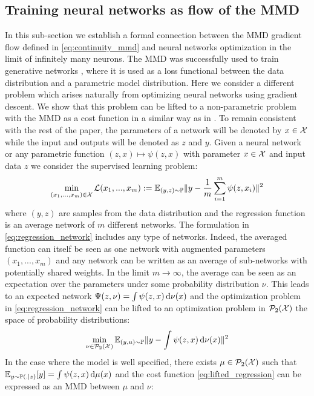 \subsection{Training neural networks as flow of the MMD}\label{subsec:training_neural_networks}
In this sub-section we establish a formal connection between the MMD gradient flow defined in \cref{eq:continuity_mmd} and neural networks optimization in the limit of infinitely many neurons.
The MMD was successfully used to train generative networks \cite{Arbel:2018,Binkowski:2018}, where it is used as a loss functional between the data distribution and a parametric model distribution.
Here we consider a different problem which arises naturally from optimizing neural networks using gradient descent. We show that this problem can be lifted to a non-parametric problem with the MMD as a cost function in a similar way as in \cite{Rotskoff:2019}. To remain consistent with the rest of the paper, the parameters of a network will be denoted by $x\in {{\mathcal X}}$ while the input and outputs will be denoted as $z$ and $y$.
 Given a neural network or any parametric function $(z,x)\mapsto \psi(z,x)$ with parameter $x \in {{\mathcal X}} $ and input data $z$ we consider the supervised learning problem:
\begin{align}\label{eq:regression_network}
	\min_{(x_1,...,x_m )\in {{\mathcal X}}} \mathcal{L}(x_1,...,x_m):= \mathbb{E}_{(y,z)\sim \mathbb{P}  }  \Vert y - \frac{1}{m}\sum_{i=1}^m\psi(z,x_i) \Vert^2
\end{align}
where $(y,z)$ are samples from the data distribution and the regression function is an average network of $m$ different networks. The formulation in \cref{eq:regression_network} includes any type of networks. Indeed, the averaged function can itself be seen as one network with augmented parameters $(x_1,...,x_m)$ and any network can be written as an average of sub-networks with potentially shared weights. In the limit $m\rightarrow \infty$, the average can be seen as an expectation over the parameters under some probability distribution $\nu$. This leads to an expected network $\Psi(z,\nu) =  \int \psi(z,x) \mathop{}\!\mathrm{d} \nu(x) $ and the optimization problem in \cref{eq:regression_network} can be lifted to an optimization problem in $\mathcal{P}_2({{\mathcal X}})$ the space of probability distributions:
\begin{align}\label{eq:lifted_regression}
	\min_{\nu \in \mathcal{P}_2({{\mathcal X}})} \mathbb{E}_{(y,u)\sim \mathbb{P} }  \Vert y - \int \psi(z,x) \mathop{}\!\mathrm{d} \nu(x) \Vert^2
\end{align} 
In the case where the model is well specified, there exists $\mu \in \mathcal{P}_2({{\mathcal X}}) $ such that $\mathbb{E}_{y\sim \mathbb{P}(.|z)}[y] =  \int \psi(z,x) \mathop{}\!\mathrm{d} \mu(x)$ and the cost function \cref{eq:lifted_regression} can be expressed as an MMD between $\mu$ and $\nu$:
